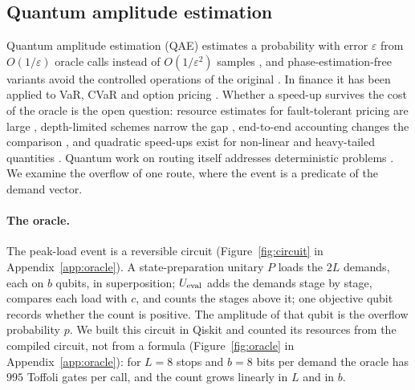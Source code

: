 \documentclass[ijoc,sglanonrev]{informs4}
\begin{document}
\subsection{Quantum amplitude estimation}
\label{sec:quantum}
Quantum amplitude estimation (QAE) estimates a probability with error $\varepsilon$
from $O(1/\varepsilon)$ oracle calls instead of $O(1/\varepsilon^{2})$ samples
\citep{Brassard2002,Montanaro2015}, and phase-estimation-free variants avoid the
controlled operations of the original \citep{Grinko2021Iterative}.
In finance it has been applied to VaR, CVaR and option pricing
\citep{Woerner2019Quantum,Egger2021Credit}. Whether a
speed-up survives the cost of the oracle is the open question: resource estimates
for fault-tolerant pricing are large \citep{Chakrabarti2021Threshold}, depth-limited
schemes narrow the gap \citep{Herbert2022Quantum}, end-to-end accounting changes the
comparison \citep{Dalzell2023Survey}, and quadratic speed-ups exist for non-linear and
heavy-tailed quantities \citep{Blanchet2025Quantum}. Quantum work on routing itself
addresses deterministic problems \citep{Feld2019Hybrid,Phillipson2024Quantum}. We examine the
overflow of one route, where the event is a predicate of the demand vector.

\paragraph{The oracle.} The peak-load event is a reversible circuit
(Figure~\ref{fig:circuit} in Appendix~\ref{app:oracle}). A state-preparation unitary $P$ loads the $2L$ demands,
each on $b$ qubits, in superposition; $U_{\rm eval}$ adds the demands stage by
stage, compares each load with $c$, and counts the stages above it; one objective
qubit records whether the count is positive. The amplitude of that qubit is the
overflow probability $p$. We built this circuit in Qiskit and counted its resources
from the compiled circuit, not from a formula (Figure~\ref{fig:oracle} in Appendix~\ref{app:oracle}): for $L=8$
stops and $b=8$ bits per demand the oracle has $995$ Toffoli gates per call, and
the count grows linearly in $L$ and in $b$.
\end{document}
